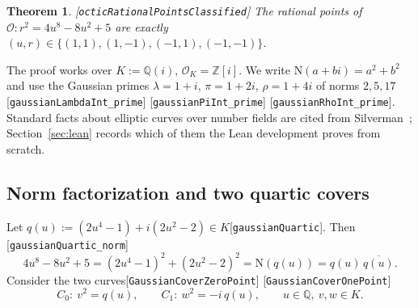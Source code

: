 \documentclass[10pt]{article}
\newtheorem{theorem}{Theorem}[section]
\theoremstyle{definition}
\theoremstyle{remark}
\newcommand{\Q}{\mathbb{Q}}
\newcommand{\Z}{\mathbb{Z}}
\newcommand{\Nm}{\mathrm{N}}
\newcommand{\lam}{\lambda}
\newcommand{\pisym}{\pi}
\newcommand{\rhosym}{\rho}
\newcommand{\leanref}[1]{{\scriptsize\textup{[\texttt{#1}]}}\allowbreak}
\begin{document}
\begin{theorem}\label{thm:octic}
\leanref{octic\allowbreak Rational\allowbreak Points\allowbreak Classified}
The rational points of $\mathcal{O}:r^2=4u^8-8u^2+5$ are exactly
$(u,r)\in\{(1,1),(1,-1),(-1,1),(-1,-1)\}$.
\end{theorem}

The proof works over $K:=\Q(i)$, $\mathcal{O}_K=\Z[i]$.  We write
$\Nm(a+bi)=a^2+b^2$ and use the Gaussian primes
$\lam=1+i$, $\pisym=1+2i$, $\rhosym=1+4i$ of norms $2,5,17$
\leanref{gaussian\allowbreak Lambda\allowbreak Int\_\allowbreak prime} \leanref{gaussian\allowbreak Pi\allowbreak Int\_\allowbreak prime} \leanref{gaussian\allowbreak Rho\allowbreak Int\_\allowbreak prime}.
Standard facts about elliptic curves over number fields are cited from
Silverman~\cite{Silverman}; Section~\ref{sec:lean} records which of them
the Lean development proves from scratch.

\subsection{Norm factorization and two quartic covers}

Let $q(u):=(2u^4-1)+i(2u^2-2)\in K$\leanref{gaussian\allowbreak Quartic}.  Then
\leanref{gaussian\allowbreak Quartic\_\allowbreak norm}
\[
 4u^8-8u^2+5=(2u^4-1)^2+(2u^2-2)^2=\Nm(q(u))=q(u)\,\overline{q(u)} .
\]
Consider the two curves\leanref{Gaussian\allowbreak Cover\allowbreak Zero\allowbreak Point} \leanref{Gaussian\allowbreak Cover\allowbreak One\allowbreak Point}
\[
 C_0:\ v^2=q(u),\qquad C_1:\ w^2=-i\,q(u),\qquad u\in\Q,\ v,w\in K .
\]
\end{document}
